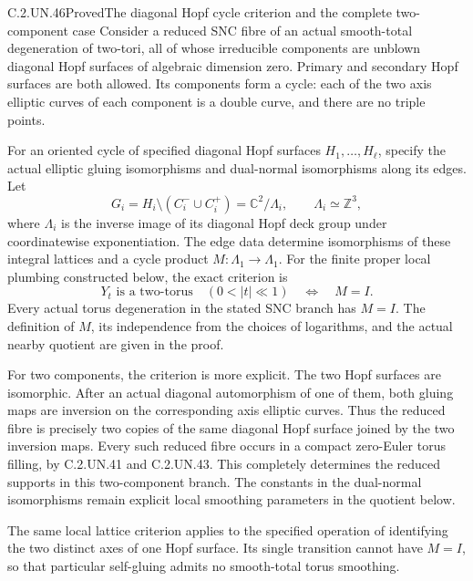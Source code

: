 \begin{statement}{C.2.UN.46}{Proved}{The diagonal Hopf cycle criterion and the complete two-component case}
Consider a reduced SNC fibre of an actual smooth-total
degeneration of two-tori, all of whose irreducible components
are unblown diagonal Hopf surfaces of algebraic dimension zero.
Primary and secondary Hopf surfaces are both allowed.
Its components form a cycle: each of the two axis elliptic
curves of each component is a double curve, and there are
no triple points.

For an oriented cycle of specified diagonal Hopf surfaces
$H_1,\ldots,H_\ell$, specify the actual elliptic gluing
isomorphisms and dual-normal isomorphisms along its edges.
Let
\[
 G_i=H_i\setminus(C_i^-\cup C_i^+)
       =\mathbb C^2/\Lambda_i,\qquad \Lambda_i\simeq\mathbb Z^3,
\tag{C.HC.1}
\]
where $\Lambda_i$ is the inverse image of its diagonal
Hopf deck group under coordinatewise exponentiation.
The edge data determine isomorphisms of these integral
lattices and a cycle product $M:\Lambda_1\to\Lambda_1$.
For the finite proper local plumbing constructed below,
the exact criterion is
\[
 \text{$Y_t$ is a two-torus}\quad(0<|t|\ll1)
       \quad\Longleftrightarrow\quad M=I.
\tag{C.HC.2}
\]
Every actual torus degeneration in the stated SNC branch
has $M=I$. The definition of $M$, its independence from
the choices of logarithms, and the actual nearby quotient
are given in the proof.

For two components, the criterion is more explicit.
The two Hopf surfaces are isomorphic. After an actual
diagonal automorphism of one of them, both gluing maps
are inversion on the corresponding axis elliptic curves.
Thus the reduced fibre is precisely two copies of the
same diagonal Hopf surface joined by the two inversion
maps. Every such reduced fibre occurs in a compact
zero-Euler torus filling, by C.2.UN.41 and C.2.UN.43.
This completely determines the reduced supports in
this two-component branch. The constants in the
dual-normal isomorphisms remain explicit local
smoothing parameters in the quotient below.

The same local lattice criterion applies to the
specified operation of identifying the two distinct
axes of one Hopf surface. Its single transition
cannot have $M=I$, so that particular self-gluing
admits no smooth-total torus smoothing.
\end{statement}

